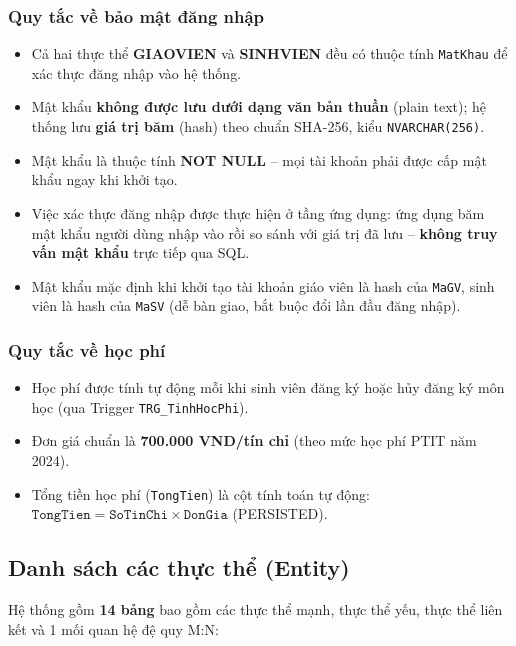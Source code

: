 \documentclass[13pt, a4paper]{article}
\begin{document}
\subsubsection{Quy tắc về bảo mật đăng nhập}
\begin{itemize}[leftmargin=1.5cm]
  \item Cả hai thực thể \textbf{GIAOVIEN} và \textbf{SINHVIEN} đều có thuộc tính \texttt{MatKhau} để xác thực đăng nhập vào hệ thống.
  \item Mật khẩu \textbf{không được lưu dưới dạng văn bản thuần} (plain text); hệ thống lưu \textbf{giá trị băm} (hash) theo chuẩn SHA-256, kiểu \texttt{NVARCHAR(256)}.
  \item Mật khẩu là thuộc tính \textbf{NOT NULL} -- mọi tài khoản phải được cấp mật khẩu ngay khi khởi tạo.
  \item Việc xác thực đăng nhập được thực hiện ở tầng ứng dụng: ứng dụng băm mật khẩu người dùng nhập vào rồi so sánh với giá trị đã lưu -- \textbf{không truy vấn mật khẩu} trực tiếp qua SQL.
  \item Mật khẩu mặc định khi khởi tạo tài khoản giáo viên là hash của \texttt{MaGV}, sinh viên là hash của \texttt{MaSV} (dễ bàn giao, bắt buộc đổi lần đầu đăng nhập).
\end{itemize}

\subsubsection{Quy tắc về học phí}
\begin{itemize}[leftmargin=1.5cm]
  \item Học phí được tính tự động mỗi khi sinh viên đăng ký hoặc hủy đăng ký môn học (qua Trigger \texttt{TRG\_TinhHocPhi}).
  \item Đơn giá chuẩn là \textbf{700.000 VND/tín chỉ} (theo mức học phí PTIT năm 2024).
  \item Tổng tiền học phí (\texttt{TongTien}) là cột tính toán tự động: $\texttt{TongTien} = \texttt{SoTinChi} \times \texttt{DonGia}$ (PERSISTED).
\end{itemize}

\subsection{Danh sách các thực thể (Entity)}

\noindent Hệ thống gồm \textbf{14 bảng} bao gồm các thực thể mạnh, thực thể yếu, thực thể liên kết và 1 mối quan hệ đệ quy M:N:
\end{document}
